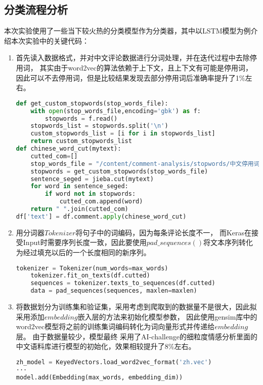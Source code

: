 \documentclass[withoutpreface,bwprint]{cumcmthesis} %
\begin{document}
\subsection{分类流程分析}
本次实验使用了一些当下较火热的分类模型作为分类器，其中以LSTM模型为例介绍本次实验中的关键代码：
\begin{enumerate}
\item 首先读入数据格式，并对中文评论数据进行分词处理，并在迭代过程中去除停用词，
其实由于word2vec的算法依赖于上下文，且上下文有可能是停用词，因此可以不去停用词，但是比较结果发现去部分停用词后准确率提升了1\%左右。
\begin{lstlisting}[language=python]
def get_custom_stopwords(stop_words_file):
    with open(stop_words_file,encoding='gbk') as f:
        stopwords = f.read()
    stopwords_list = stopwords.split('\n')
    custom_stopwords_list = [i for i in stopwords_list]
    return custom_stopwords_list
def chinese_word_cut(mytext):
    cutted_com=[]
    stop_words_file = "/content/comment-analysis/stopwords/中文停用词库.txt"
    stopwords = get_custom_stopwords(stop_words_file)
    sentence_seged = jieba.cut(mytext)
    for word in sentence_seged:
        if word not in stopwords:
            cutted_com.append(word)
    return " ".join(cutted_com)
df['text'] = df.comment.apply(chinese_word_cut)
    \end{lstlisting}
\item 用分词器$Tokenizer$将句子中的词编码，因为每条评论长度不一，
而Keras在接受Input时需要序列长度一致，因此要使用$pad\_sequences()$将文本序列转化为经过填充以后的一个长度相同的新序列。
\begin{lstlisting}[language=python]
    tokenizer = Tokenizer(num_words=max_words)
    tokenizer.fit_on_texts(df.cutted)
    sequences = tokenizer.texts_to_sequences(df.cutted)
    data = pad_sequences(sequences, maxlen=maxlen)
    \end{lstlisting}
\item 将数据划分为训练集和验证集，采用考虑到爬取到的数据量不是很大，因此拟采用添加$embedding$嵌入层的方法来初始化模型参数，
因此使用gensim库中的word2vec模型将之前的训练集词编码转化为词向量形式并传递给$embedding$层。
由于数据量较少，模型最终
采用了AI-challenge的细粒度情感分析里面的中文语料库进行模型的初始化，效果相较提升了8\%左右。
\begin{lstlisting}[language=python]
zh_model = KeyedVectors.load_word2vec_format('zh.vec')
···
model.add(Embedding(max_words, embedding_dim))
    \end{lstlisting}


\end{enumerate}
\end{document}
